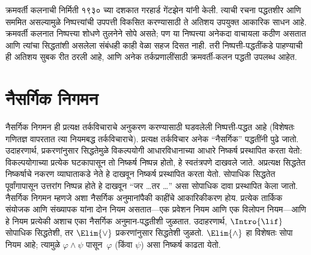 क्रमवर्ती कलनाची निर्मिती १९३० च्या दशकात गरहार्ड गेंटझेन यांनी केली.
त्याची रचना पद्धतशीर आणि सममित असल्यामुळे निष्पत्त्यांची उपपत्ती
विकसित करण्यासाठी ते अतिशय उपयुक्त आकारिक साधन आहे. क्रमवर्ती कलनात
निष्पत्त्या शोधणे तुलनेने सोपे असते; पण या निष्पत्त्या अनेकदा
वाचायला कठीण असतात आणि त्यांचा सिद्धतांशी असलेला संबंधही काही वेळा
सहज दिसत नाही. तरी निष्पत्ती-पद्धतींकडे पाहण्याची ही अतिशय सुबक
रीत ठरली आहे, आणि अनेक तर्कप्रणालींसाठी क्रमवर्ती-कलन पद्धती उपलब्ध आहेत.









\section{नैसर्गिक निगमन}\label{fol:prf:ntd:sec}

नैसर्गिक निगमन ही प्रत्यक्ष तर्कविचाराचे अनुकरण करण्यासाठी घडवलेली
निष्पत्ती-पद्धत आहे (विशेषतः गणितज्ञ वापरतात त्या नियमबद्ध
तर्कविचाराचे). प्रत्यक्ष तर्कविचार अनेक ``नैसर्गिक'' पद्धतींनी पुढे जातो.
उदाहरणार्थ, प्रकरणांनुसार सिद्धतेमुळे विकल्पयोगी आधारविधानाच्या आधारे
निष्कर्ष प्रस्थापित करता येतो: विकल्पयोगाच्या प्रत्येक घटकापासून
तो निष्कर्ष निष्पन्न होतो, हे स्वतंत्रपणे दाखवले जाते. अप्रत्यक्ष सिद्धतेत
निष्कर्षाचे नकरण व्याघाताकडे नेते हे दाखवून निष्कर्ष प्रस्थापित करता येतो.
सोपाधिक सिद्धतेत पूर्वांगापासून उत्तरांग निष्पन्न होते हे दाखवून
``जर \dots तर \dots'' असा सोपाधिक दावा प्रस्थापित केला जातो. नैसर्गिक
निगमन म्हणजे अशा नैसर्गिक अनुमानांपैकी काहींचे आकारिकीकरण होय. प्रत्येक
तार्किक संयोजक आणि संख्यापक यांना दोन नियम असतात—एक प्रवेशन नियम आणि एक
विलोपन नियम—आणि हे नियम प्रत्येकी अशाच एका नैसर्गिक अनुमान-पद्धतीशी
जुळतात. उदाहरणार्थ, $\Intro{\lif}$ सोपाधिक सिद्धतेशी, तर $\Elim{\lor}$
प्रकरणांनुसार सिद्धतेशी जुळतो. $\Elim{\land}$ हा विशेषतः सोपा नियम आहे;
त्यामुळे $\varphi \land \psi$ पासून~$\varphi$ (किंवा $\psi$) असा निष्कर्ष काढता येतो.

